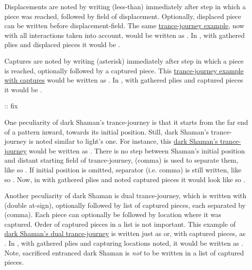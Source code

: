 Displacements are noted by writing \alg{<} (less-than) immediately after step in which a
piece was reached, followed by field of displacement. Optionally, displaced piece can be
written before displacement-field. The same
\hyperref[fig:scn_cot_57_light_light_shaman_interaction_end]{trance-journey example},
now with all interactions taken into account, would be written as
.
In , with gathered plies and displaced pieces it would be \newline
{}.

Captures are noted by writing \alg{*} (asterisk) immediately after step in which a piece
is reached, optionally followed by a captured piece. This
\hyperref[fig:scn_cot_59_dark_light_shaman_interaction_end]{trance-journey example with captures}
would be written as \newline
{}. In , with gathered plies and
captured pieces it would be \newline
{}.

\TODO :: fix

One peculiarity of dark Shaman's trance-journey is that it starts from the far end
of a pattern inward, towards its initial position. Still, dark Shaman's trance-journey
is noted similar to light's one. For instance, this
\hyperref[fig:scn_cot_60_dark_dark_shaman_interaction_start]{dark Shaman's trance-journey}
would be written as .
There is no step between Shaman's initial position and distant starting field of
trance-journey, \alg{,} (comma) is used to separate them, like so
.
If initial position is omitted, separator (i.e. comma) is still written, like so
. Now, in  with gathered plies
and noted captured pieces it would look like so \newline
{} \newline
\alg{[He12,w18..q16*P..k14*N..c18]}.

Another peculiarity of dark Shaman is dual trance-journey, which is written with 
(double at-sign), optionally followed by list of captured pieces, each separated by \alg{,}
(comma). Each piece can optionally be followed by location where it was captured. Order of
captured pieces in a list is not important. This example of
\hyperref[fig:scn_cot_62_dark_dark_shaman_double_interaction_start]{dark Shaman's dual trance-journey}
is written just as  or, with captured pieces, as
. In , with gathered plies and capturing
locations noted, it would be written as \newline
{} \newline
{}. \newline
Note, sacrificed entranced dark Shaman is \emph{not} to be written in a list of captured
pieces.

